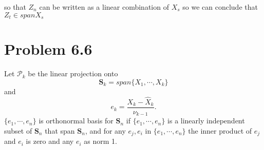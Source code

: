 \documentclass[11pt, oneside]{article}   	%
\begin{document}
so that $Z_{n}$ can be written as a linear combination of $X_{s}$ so we can conclude that $Z_{t} \in span{X_{s}}$
\section{Problem 6.6}
Let $\mathcal{P}_{k}$ be the linear projection onto
\begin{equation}\label{eq:e}
\textbf{S}_{k} = span\{ X_{1},\cdots, X_{k}  \}
\end{equation}
and 
\begin{equation}\label{eq:e0}
e_{k} = \frac{X_{k}-\hat{X}_{k}}{\nu_{k-1}}.
\end{equation}
$\{e_{1},\cdots,e_{n}\}$
is orthonormal basis for $\textbf{S}_{n}$ if $\{e_{1},\cdots,e_{n}\}$ is a linearly independent subset of $\textbf{S}_{n}$ that span $\textbf{S}_{n}$, and for any $e_{j}, e_{i}$ in $\{e_{1},\cdots,e_{n}\}$ 
the inner product of $e_{j}$ and $e_{i}$ is zero and any $e_{i}$ as norm 1.
\justify
\end{document}
